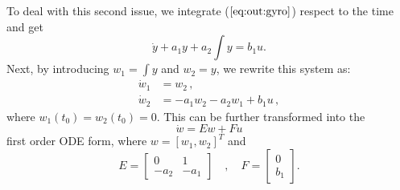 \documentclass[a4paper]{article}
\begin{document}
To deal with this second issue, we integrate 
($\ref{eq:out:gyro}$) respect to the time and get
\begin{equation}
    \dot{y} + a_1 y + a_2 \int y = b_1 u .
\end{equation}
Next, by introducing  $w_1 = \int y$ and $w_2 = y$, we  rewrite this system as:
\begin{equation} \begin{split}
    \dot{w}_1 &= w_2\,, \\
    \dot{w}_2 &= - a_1 w_2 - a_2 w_1 + b_1 u\,,
\end{split} \end{equation}
where $w_1(t_0) = w_2(t_0) = 0$. This can be further transformed into the
\begin{equation}
    \dot{w} = E w + F u
\end{equation}
first order ODE form, where $w = [w_1,w_2]^T$ and
\begin{equation}
    E = \left[ \begin{array}{cc}
            0 & 1 \\
            -a_2 & -a_1
        \end{array} \right]
        \quad , \quad
        F = 
        \left[ \begin{array}{c}
            0 \\
            b_1
        \end{array} \right] .
\end{equation}
\end{document}
